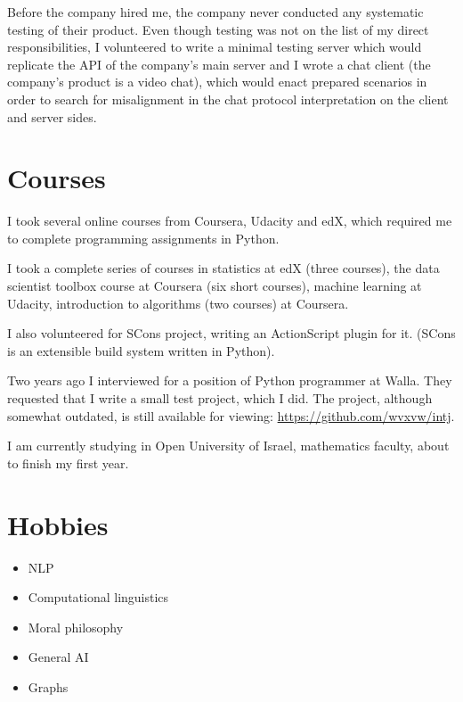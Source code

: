 \documentclass[11pt]{article}
\begin{document}
Before the company hired me, the company never conducted any systematic
testing of their product.  Even though testing was not on the list of my
direct responsibilities, I volunteered to write a minimal testing server
which would replicate the API of the company's main server and I wrote a chat
client (the company's product is a video chat), which would enact prepared
scenarios in order to search for misalignment in the chat protocol
interpretation on the client and server sides.

\section{Courses}
\label{sec:orgheadline7}
I took several online courses from Coursera, Udacity and edX, which required
me to complete programming assignments in Python.

I took a complete series of courses in statistics at edX (three courses),
the data scientist toolbox course at Coursera (six short courses), machine
learning at Udacity, introduction to algorithms (two courses) at Coursera.

I also volunteered for SCons project, writing an ActionScript plugin for it.
(SCons is an extensible build system written in Python).

Two years ago I interviewed for a position of Python programmer at Walla.
They requested that I write a small test project, which I did.  The project,
although somewhat outdated, is still available for viewing:
\url{https://github.com/wvxvw/intj}.

I am currently studying in Open University of Israel, mathematics faculty,
about to finish my first year.

\section{Hobbies}
\label{sec:orgheadline8}
\begin{itemize}
\item NLP
\item Computational linguistics
\item Moral philosophy
\item General AI
\item Graphs
\end{itemize}
\end{document}
